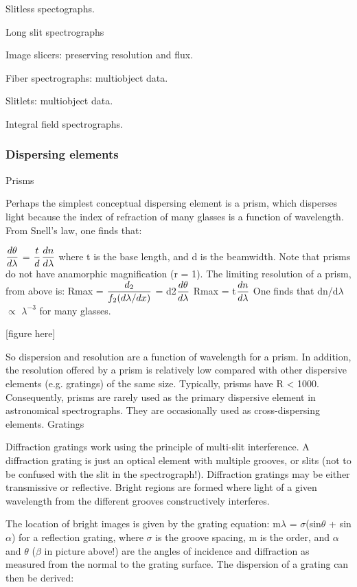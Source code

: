 \documentclass[12pt]{article}
\begin{document}
Slitless spectographs.

Long slit spectrographs

Image slicers: preserving resolution and flux.

Fiber spectrographs: multiobject data.

Slitlets: multiobject data.

Integral field spectrographs.



\subsubsection*{Dispersing elements}

Prisms

Perhaps the simplest conceptual dispersing element is a prism, which
disperses light because the index of refraction of many glasses is a
function of wavelength. From Snell's law, one finds that:

$\displaystyle {d\theta\over d\lambda}$ = $\displaystyle {t\over
d}$$\displaystyle {dn\over d\lambda}$
where t is the base length, and d is the beamwidth. Note that prisms
do not have anamorphic magnification (r = 1). The limiting resolution
of a prism, from above is:
Rmax = $\displaystyle {d_2 \over f_2 (d\lambda/dx)}$ =
d2$\displaystyle {d\theta\over d\lambda}$
Rmax = t$\displaystyle {dn\over d\lambda}$
One finds that dn/d$ \lambda$ $ \propto$ $ \lambda^{{-3}}_{}$ for many
glasses.

[figure here]

So dispersion and resolution are a function of wavelength for a prism.
In addition, the resolution offered by a prism is relatively low
compared with other dispersive elements (e.g. gratings) of the same
size. Typically, prisms have R < 1000. Consequently, prisms are rarely
used as the primary dispersive element in astronomical spectrographs.
They are occasionally used as cross-dispersing elements.
Gratings

Diffraction gratings work using the principle of multi-slit
interference. A diffraction grating is just an optical element with
multiple grooves, or slits (not to be confused with the slit in the
spectrograph!). Diffraction gratings may be either transmissive or
reflective. Bright regions are formed where light of a given
wavelength from the different grooves constructively interferes.

The location of bright images is given by the grating equation:
m$\displaystyle \lambda$ = $\displaystyle \sigma$(sin$\displaystyle
\theta$ + sin$\displaystyle \alpha$)
for a reflection grating, where $ \sigma$ is the groove spacing, m is
the order, and $ \alpha$ and $ \theta$ ($ \beta$ in picture above!)
are the angles of incidence and diffraction as measured from the
normal to the grating surface.
The dispersion of a grating can then be derived:
\end{document}

